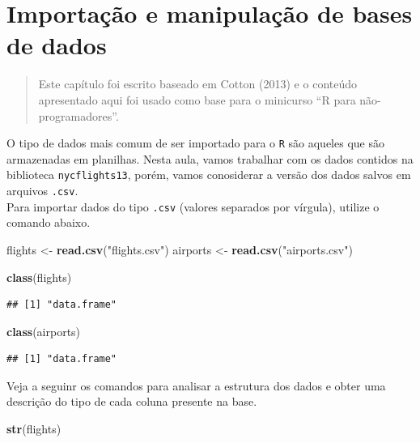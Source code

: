 \documentclass[
]{book}
\newenvironment{Shaded}{\begin{snugshade}}{\end{snugshade}}
\newcommand{\FunctionTok}[1]{\textcolor[rgb]{0.13,0.29,0.53}{\textbf{#1}}}
\newcommand{\NormalTok}[1]{#1}
\newcommand{\OtherTok}[1]{\textcolor[rgb]{0.56,0.35,0.01}{#1}}
\newcommand{\StringTok}[1]{\textcolor[rgb]{0.31,0.60,0.02}{#1}}
\begin{document}
\chapter{Importação e manipulação de bases de dados}\label{importauxe7uxe3o-e-manipulauxe7uxe3o-de-bases-de-dados}

\begin{quote}
Este capítulo foi escrito baseado em Cotton (2013) e o conteúdo apresentado aqui foi usado como base para o minicurso ``R para não-programadores''.
\end{quote}

O tipo de dados mais comum de ser importado para o \texttt{R} são aqueles que são armazenadas em planilhas.
Nesta aula, vamos trabalhar com os dados contidos na biblioteca \texttt{nycflights13}, porém, vamos conosiderar a versão dos dados salvos em arquivos \texttt{.csv}.\\
Para importar dados do tipo \texttt{.csv} (valores separados por vírgula), utilize o comando abaixo.

\begin{Shaded}
\begin{Highlighting}[]
\NormalTok{flights }\OtherTok{\textless{}{-}} \FunctionTok{read.csv}\NormalTok{(}\StringTok{"flights.csv"}\NormalTok{)}
\NormalTok{airports }\OtherTok{\textless{}{-}} \FunctionTok{read.csv}\NormalTok{(}\StringTok{"airports.csv"}\NormalTok{)}

\FunctionTok{class}\NormalTok{(flights)}
\end{Highlighting}
\end{Shaded}

\begin{verbatim}
## [1] "data.frame"
\end{verbatim}

\begin{Shaded}
\begin{Highlighting}[]
\FunctionTok{class}\NormalTok{(airports)}
\end{Highlighting}
\end{Shaded}

\begin{verbatim}
## [1] "data.frame"
\end{verbatim}

Veja a seguinr os comandos para analisar a estrutura dos dados e obter uma descrição do tipo de cada coluna presente na base.

\begin{Shaded}
\begin{Highlighting}[]
\FunctionTok{str}\NormalTok{(flights)}
\end{Highlighting}
\end{Shaded}
\end{document}
